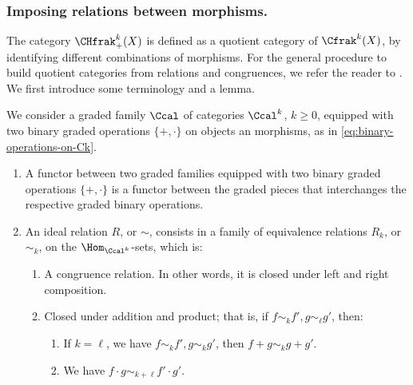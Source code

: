 \subsubsection*{ Imposing relations between morphisms.} The category $\CHfrak_+^k(X)$ is defined as a quotient category of $\Cfrak^{k}(X)$, by identifying different combinations of morphisms. For the general procedure to build quotient categories from relations and congruences, we refer the reader to \cite[Chap.\,II, Section 8, Proposition 1]{MacLane-cat}. We first introduce some terminology and a lemma.

\begin{definition}\label{def:ideal-relation}
We consider a graded family $\Ccal$ of categories $\Ccal^{k}$, $k\geq 0$, equipped with two binary graded operations $\{+, \cdot \}$ on objects an morphisms, as in \eqref{eq:binary-operations-on-Ck}.

\begin{enumerate}
\item A functor between two graded families equipped with two binary graded operations $\{+, \cdot\}$ is a functor between the graded pieces that interchanges the respective graded binary operations.

\item An ideal relation $R$, or $\sim$, consists in a family of equivalence relations $R_k$, or~$\sim_k$, on the $\Hom_{\Ccal^k}$-sets, which is:
\begin{enumerate}
\item\label{item:ideal-relation-1} A congruence relation. In other words, it is closed under left and right composition.
\item\label{item:ideal-relation-2} Closed under addition and product; that is, if $f \sim_k f', g \sim_\ell g'$, then:
\begin{enumerate}
\item If $k = \ell$, we have $f \sim_k f', g \sim_k g'$, then $f + g \sim_{k} g + g'$.
\item We have $f \cdot g \sim_{k+\ell} f' \cdot g'$.
\end{enumerate}
\end{enumerate}
\end{enumerate}
\end{definition}

